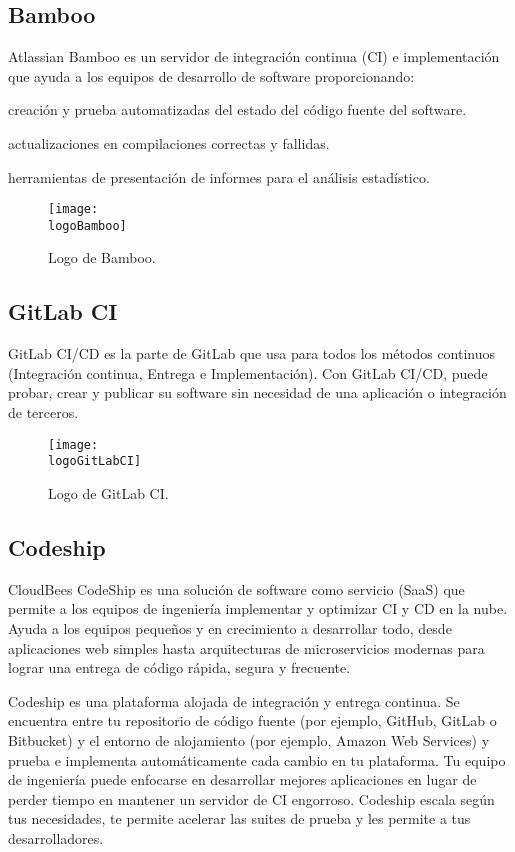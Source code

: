 \subsection{Bamboo}
Atlassian Bamboo es un servidor de integración continua (CI) e implementación que ayuda a los equipos de desarrollo de software proporcionando:
\begin{compactitem}
    \item creación y prueba automatizadas del estado del código fuente del software.
    \item actualizaciones en compilaciones correctas y fallidas.
    \item herramientas de presentación de informes para el análisis estadístico.
\end{compactitem}

\begin{figure}[h]
    \centering
    \texttt{[image: \\logoBamboo]}
    \caption{Logo de Bamboo.}
\end{figure}

\subsection{GitLab CI}
GitLab CI/CD es la parte de GitLab que usa para todos los métodos continuos (Integración continua, Entrega e Implementación). Con GitLab CI/CD, puede probar, crear y publicar su software sin necesidad de una aplicación o integración de terceros.

\begin{figure}[h]
    \centering
    \texttt{[image: \\logoGitLabCI]}
    \caption{Logo de GitLab CI.}
\end{figure}

\subsection{Codeship}
CloudBees CodeShip es una solución de software como servicio (SaaS) que permite a los equipos de ingeniería implementar y optimizar CI y CD en la nube. Ayuda a los equipos pequeños y en crecimiento a desarrollar todo, desde aplicaciones web simples hasta arquitecturas de microservicios modernas para lograr una entrega de código rápida, segura y frecuente.

Codeship es una plataforma alojada de integración y entrega continua. Se encuentra entre tu repositorio de código fuente (por ejemplo, GitHub, GitLab o Bitbucket) y el entorno de alojamiento (por ejemplo, Amazon Web Services) y prueba e implementa automáticamente cada cambio en tu plataforma. Tu equipo de ingeniería puede enfocarse en desarrollar mejores aplicaciones en lugar de perder tiempo en mantener un servidor de CI engorroso. Codeship escala según tus necesidades, te permite acelerar las suites de prueba y les permite a tus desarrolladores.

